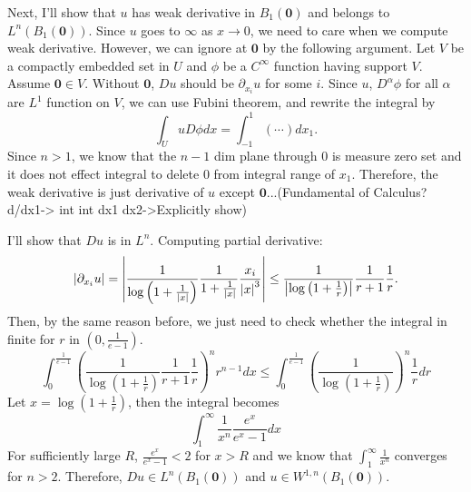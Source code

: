\documentclass{article}
\begin{document}
Next, I'll show that $u$ has weak derivative in $B_1(\bm{0})$ and belongs to $L^n(B_1(\bm{0}))$. Since $u$ goes to $\infty $ as $x\rightarrow 0$, we need to care when we compute weak derivative. However, we can ignore at $\bm{0}$ by the following argument. Let $V$ be a compactly embedded set in $U$ and $\phi$ be a $C^\infty$ function having support $V$. Assume $\bm{0}\in V$. Without $\bm{0}$, $D u$ should be $\partial_{x_i}u$ for some $i$. Since $u$, $D^\alpha \phi$ for all $\alpha$ are $L^1$ function on $V$, we can use Fubini theorem, and rewrite the integral by
\begin{equation*}
\int_U uD \phi dx=\int_{-1}^1 (\cdots) dx_1.
\end{equation*}
Since $n>1$, we know that the $n-1$ dim plane through $0$ is measure zero set and it does not effect integral to delete $0$ from integral range of $x_1$. Therefore, the weak derivative is just derivative of $u$ except $\bm{0}$...(Fundamental of Calculus? d/dx1-> int int dx1 dx2->Explicitly show)

I'll show that $Du$ is in $L^n$. Computing partial derivative:
\begin{equation*}
\abs{\partial_{x_i} u}=\abs{\frac{1}{\log\left(1+\frac{1}{\abs{x}}\right)}\frac{1}{1+\frac{1}{\abs{x}}}\frac{x_i}{\abs{x}^3}}\leq  \frac{1}{\abs{\log\left(1+\frac{1}{r}\right)}}\frac{1}{r+1}\frac{1}{r}.
\end{equation*}
Then, by the same reason before, we just need to check whether the integral in finite for $r$ in $\left(0, \frac{1}{e-1}\right)$.
\begin{equation*}
\int_0^{\frac{1}{e-1}} \left(\frac{1}{\log\left(1+\frac{1}{r}\right)}\frac{1}{r+1}\frac{1}{r}\right)^n r^{n-1}dx \leq \int_0^{\frac{1}{e-1}} \left(\frac{1}{\log\left(1+\frac{1}{r}\right)}\right)^n \frac{1}{r}dr
\end{equation*}
Let $x=\log\left(1+\frac{1}{r}\right)$, then the integral becomes
\begin{equation*}
\int_1^\infty \frac{1}{x^n}\frac{e^x}{e^x-1}dx
\end{equation*}
For sufficiently large $R$, $\frac{e^x}{e^x-1}<2$ for $x>R$ and we know that $\int_1^\infty \frac{1}{x^n}$ converges for $n>2$. Therefore, $Du\in L^n(B_1(\bm{0}))$ and $u\in W^{1,n}(B_1(\bm{0}))$.
\end{document}

